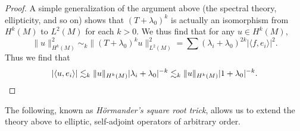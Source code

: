 \begin{proof}
    A simple generalization of the argument above (the spectral theory, ellipticity, and so on) shows that $(T + \lambda_0)^k$ is actually an isomorphism from $H^k(M)$ to $L^2(M)$ for each $k > 0$. We thus find that for any $u \in H^k(M)$,
    \[ \| u \|_{H^k(M)}^2 \sim_k \| (T + \lambda_0)^k u \|_{L^2(M)}^2 = \sum (\lambda_i + \lambda_0)^{2k} |\langle f, e_i \rangle|^2. \]
    Thus we find that
    \[ |\langle u, e_i \rangle| \lesssim_k \| u \|_{H^k(M)} |\lambda_i + \lambda_0|^{-k} \lesssim_k \| u \|_{H^k(M)} |1 + \lambda_0|^{-k}. \qedhere \] 
\end{proof}

The following, known as \emph{H\"{o}rmander's square root trick}, allows us to extend the theory above to elliptic, self-adjoint operators of arbitrary order.

